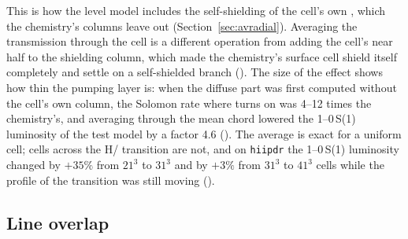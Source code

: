 This is how the level model includes the self-shielding of the cell's own
\Htwo, which the chemistry's columns leave out (Section~\ref{sec:avradial}).
Averaging the transmission through the cell is a different operation from
adding the cell's near half to the shielding column, which made the
chemistry's surface cell shield itself completely and settle on a
self-shielded branch (). The size of the effect shows how thin the
pumping layer is: when the diffuse part was first computed without the cell's
own column, the Solomon rate where \Htwo{} turns on was 4--12 times the
chemistry's, and averaging through the mean chord lowered the 1--0\,S(1)
luminosity of the test model by a factor 4.6 (). The
average is exact for a uniform cell; cells across the H/\Htwo{} transition are
not, and on \texttt{hiipdr} the 1--0\,S(1) luminosity changed by $+35\%$ from
$21^3$ to $31^3$ and by $+3\%$ from $31^3$ to $41^3$ cells while the \Htwo{} profile
of the transition was still moving ().

\subsection{Line overlap}
\label{sec:overlap}

